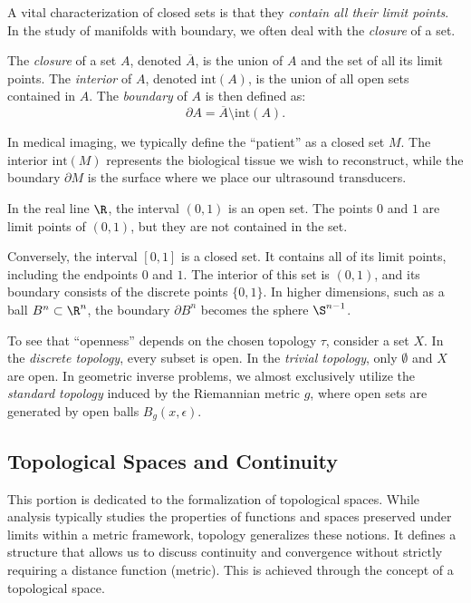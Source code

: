 A vital characterization of closed sets is that they \emph{contain all their limit points}. In the study of manifolds with boundary, we often deal with the \emph{closure} of a set.

\begin{definition}
  The \emph{closure} of a set $A$, denoted $\overline{A}$, is the union of $A$ and the set of all its limit points. The \emph{interior} of $A$, denoted $\text{int}(A)$, is the union of all open sets contained in $A$. The \emph{boundary} of $A$ is then defined as:
  \[%
    \partial A = \overline{A} \setminus \text{int}(A)
  .\]%
\end{definition}

In medical imaging, we typically define the ``patient'' as a closed set $M$. The interior $\text{int}(M)$ represents the biological tissue we wish to reconstruct, while the boundary $\partial M$ is the surface where we place our ultrasound transducers.

\begin{example}
  In the real line $\R$, the interval $(0, 1)$ is an open set. The points $0$ and $1$ are limit points of $(0, 1)$, but they are not contained in the set.

  Conversely, the interval $[0, 1]$ is a closed set. It contains all of its limit points, including the endpoints $0$ and $1$. The interior of this set is $(0, 1)$, and its boundary consists of the discrete points $\{0, 1\}$. In higher dimensions, such as a ball $B^n \subset \R^n$, the boundary $\partial B^n$ becomes the sphere $\S^{n-1}$.
\end{example}

\begin{example}
  To see that ``openness'' depends on the chosen topology $\tau$, consider a set $X$. In the \emph{discrete topology}, every subset is open. In the \emph{trivial topology}, only $\emptyset$ and $X$ are open. In geometric inverse problems, we almost exclusively utilize the \emph{standard topology} induced by the Riemannian metric $g$, where open sets are generated by open balls $B_g(x, \epsilon)$.
\end{example}

\subsection{Topological Spaces and Continuity} This portion is dedicated to the formalization of topological spaces. While analysis typically studies the properties of functions and spaces preserved under limits within a metric framework, topology generalizes these notions. It defines a structure that allows us to discuss continuity and convergence without strictly requiring a distance function (metric). This is achieved through the concept of a topological space.

